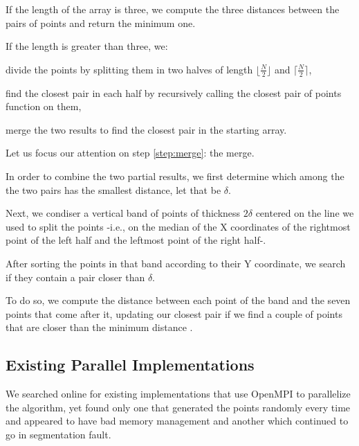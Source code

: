 If the length of the array is three, we compute the three distances between the pairs of points and return the minimum one.

If the length is greater than three, we:
\begin{inlinelist}
    \item divide the points by splitting them in two halves of length $\lfloor \frac{N}{2} \rfloor$ and $\lceil \frac{N}{2} \rceil$,
    \item find the closest pair in each half by recursively calling the closest pair of points function on them,
    \item merge the two results to find the closest pair in the starting array. \label{step:merge}
\end{inlinelist}

Let us focus our attention on step \ref{step:merge}: the merge.

In order to combine the two partial results, we first determine which among the the two pairs has the smallest distance, let that be $\delta$.

Next, we condiser a vertical band of points of thickness $2\delta$ centered on the line we used to split the points -i.e., on the median of the X coordinates of the rightmost point of the left half and the leftmost point of the right half-.

After sorting the points in that band according to their Y coordinate, we search if they contain a pair closer than $\delta$.

To do so, we compute the distance between each point of the band and the seven points that come after it,
updating our closest pair if we find a couple of points that are closer than the minimum distance \cite{lingqi}.


\subsection{Existing Parallel Implementations}
We searched online for existing implementations that use OpenMPI to parallelize the algorithm, yet found only one \cite{gh1} that generated the points randomly every time and appeared to have bad memory management and another \cite{gh2_fortran} which continued to go in segmentation fault.
